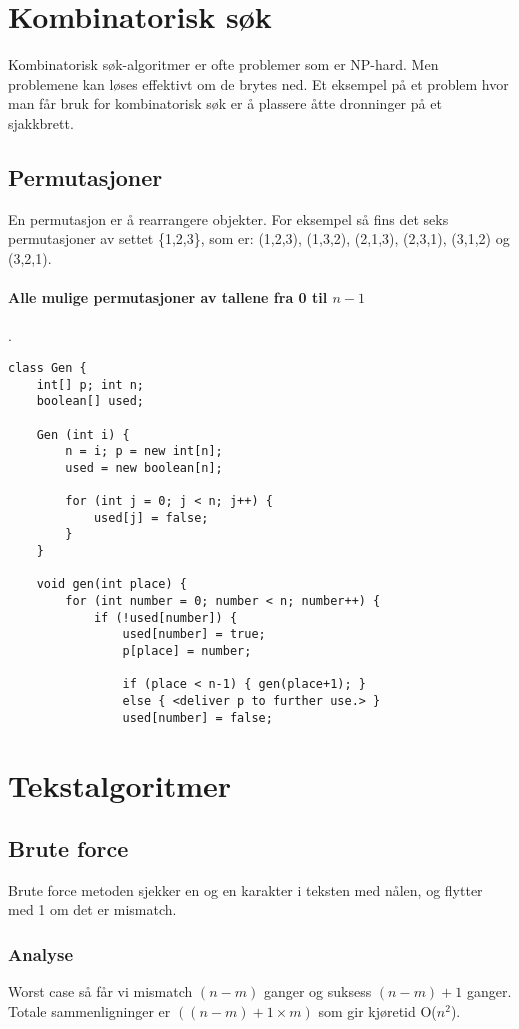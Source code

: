 \documentclass[11pt,a4paper]{article}
\theoremstyle{def}
\begin{document}
\newpage

\section{Kombinatorisk søk}
Kombinatorisk søk-algoritmer er ofte problemer som er NP-hard. Men problemene kan løses effektivt om de brytes ned. Et eksempel på et problem hvor man får bruk for kombinatorisk søk er å plassere åtte dronninger på et sjakkbrett. 
\vspace{-10pt}
\subsection{Permutasjoner}

En permutasjon er å rearrangere objekter. For eksempel så fins det seks permutasjoner av settet \{1,2,3\}, som er: (1,2,3), (1,3,2), (2,1,3), (2,3,1), (3,1,2) og (3,2,1).
\vspace{-20pt}
\paragraph{Alle mulige permutasjoner av tallene fra 0 til $n-1$}.
\begin{lstlisting}[frame=none]
class Gen {
	int[] p; int n;
	boolean[] used;
	
	Gen (int i) {
		n = i; p = new int[n];
		used = new boolean[n];
	
		for (int j = 0; j < n; j++) {
			used[j] = false;
		}
	}

	void gen(int place) {
		for (int number = 0; number < n; number++) {
			if (!used[number]) {
				used[number] = true;
				p[place] = number;
				
				if (place < n-1) { gen(place+1); }
				else { <deliver p to further use.> }
				used[number] = false;
\end{lstlisting}
\vspace{-30pt}
\section{Tekstalgoritmer}

\subsection{Brute force}
Brute force metoden sjekker en og en karakter i teksten med nålen, og flytter med 1 om det er mismatch.

\subsubsection{Analyse}
Worst case så får vi mismatch $(n-m)$ ganger og suksess $(n-m)+1$ ganger. Totale sammenligninger er $((n-m)+1 \times m)$ som gir kjøretid O($n^2$).
\end{document}
